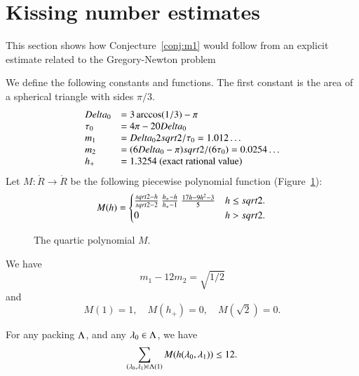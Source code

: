 \section{Kissing number estimates}

This section shows how Conjecture~\ref{conj:m1} would follow from an explicit estimate
related to the Gregory-Newton problem


We define the following constants and functions.  The first constant
is the area of a spherical triangle with sides $\pi/3$.
$$
\begin{array}{lll}
\Delta_0 &= 3\arccos(1/3)-\pi\\
\tau_0 &= 4\pi - 20\Delta_0\\
m_1 &= \Delta_0 2\sqrt2/\tau_0 = 1.012\ldots \\ %
m_2  &= (6\Delta_0- \pi)\sqrt2/(6 \tau_0) = 0.0254\ldots\\ %
h_+ &= 1.3254 \hbox{~(exact rational value)}
\end{array}
$$
Let $M:\ring{R}\to\ring{R}$ 
be the following piecewise polynomial function (Figure~\ref{fig:M}):
$$
M(h) =
\begin{cases}
\frac{\sqrt2-h}{\sqrt2-2}~ \frac{h_+-h}{h_+-1} ~\frac{17 h - 9 h^2 - 3}{5} & h \le \sqrt2. \\
 0 & h >\sqrt2.
\end{cases}
\\
$$
\begin{figure}[htb]
  \centering
  \caption{The quartic polynomial $M$.}
  \label{fig:M}
\end{figure}

We have 
\begin{equation}\label{eqn:km}m_1 - 12m_2 = \sqrt{1/2}\end{equation}
and
\begin{equation}M(1) = 1,\quad M(h_+)=0,\quad M(\sqrt2) =0.\end{equation}


\begin{conjecture}[Marchal]\label{conj:m1} For any packing $\Lam$, and
any $\lam_0\in\Lam$, we have
$$
\sum_{(\lam_0,\lam_1)\in\Lam(1)} M(h(\lam_0,\lam_1)) \le 12.
$$
\end{conjecture}

